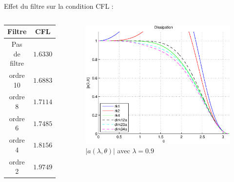 \documentclass[11pt]{beamer}
\begin{document}
\begin{frame}
Effet du filtre sur la condition CFL :

\begin{columns}
\begin{center}
\begin{tabular}{cc}
Filtre & CFL\\
\hline
\hline
Pas de filtre & $1.6330$\\
\hline
ordre 10 & $1.6883$\\
\hline
ordre 8 & $1.7114$\\
\hline
ordre 6 & $1.7485$\\
\hline
ordre 4 & $1.8156$\\
\hline
ordre 2 & $1.9749$
\end{tabular}
\end{center}

\begin{figure}
\begin{center}
\includegraphics[scale=0.35]{filtre.eps}
\caption{$|a(\lambda, \theta)|$ avec $\lambda = 0.9$}
\end{center}
\end{figure}

\end{columns}

\end{frame}
\end{document}

